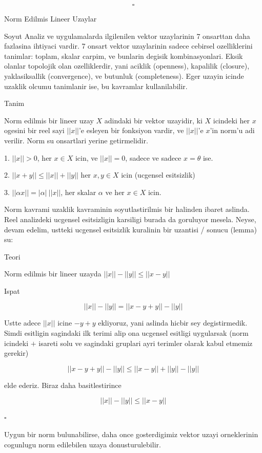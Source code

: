 \documentclass[12pt,fleqn]{article}\usepackage{../common}
\begin{document}
\[ \square \]

Norm Edilmis Lineer Uzaylar

Soyut Analiz ve uygulamalarda ilgilenilen vektor uzaylarinin 7 onsarttan
daha fazlasina ihtiyaci vardir. 7 onsart vektor uzaylarinin sadece cebirsel
ozelliklerini tanimlar: toplam, skalar carpim, ve bunlarin degisik
kombinasyonlari. Eksik olanlar topolojik olan ozelliklerdir, yani aciklik
(openness), kapalilik (closure), yaklasiksallik (convergence), ve butunluk
(completeness). Eger uzayin icinde uzaklik olcumu tanimlanir ise, bu
kavramlar kullanilabilir. 

Tanim

Norm edilmis bir lineer uzay $X$ adindaki bir vektor uzayidir, ki $X$
icindeki her $x$ ogesini bir reel sayi $||x||$'e esleyen bir fonksiyon
vardir, ve $||x||$'e $x$'in norm'u adi verilir. Norm su onsartlari yerine
getirmelidir. 

1. $||x|| > 0$, her $x \in X$ icin, ve $||x|| = 0$, sadece ve sadece $x =
\theta$ ise. 

2. $||x+y|| \le ||x|| + ||y||$ her $x,y \in X$ icin (ucgensel esitsizlik) 

3. $||\alpha x|| = |\alpha| \ ||x||$, her skalar $\alpha$ ve her $x \in X$ icin. 

Norm kavrami uzaklik kavraminin soyutlastirilmis bir halinden ibaret
aslinda. Reel analizdeki ucgensel esitsizligin karsiligi burada da
goruluyor mesela. Neyse, devam edelim, ustteki ucgensel esitsizlik
kuralinin bir uzantisi / sonucu (lemma) su:

Teori 

Norm edilmis bir lineer uzayda $||x|| - ||y|| \le ||x-y|| \ \ \ \label{1}$ 

Ispat

\[ ||x|| - ||y|| = ||x - y + y|| - ||y||\]

Ustte adece $||x||$ icine $-y+y$ ekliyoruz, yani aslinda hicbir sey
degistirmedik. Simdi esitligin sagindaki ilk terimi alip ona ucgensel
esitligi uygularsak (norm icindeki $+$ isareti solu ve sagindaki gruplari
ayri terimler olarak kabul etmemiz gerekir)

\[ ||x - y + y|| - ||y|| \le
||x - y || + ||y|| - ||y|| 
\]

elde ederiz. Biraz daha basitlestirince

\[ ||x|| - ||y||  \le ||x - y ||  \]

$\square$

Uygun bir norm bulunabilirse, daha once gosterdigimiz vektor uzayi
orneklerinin cogunlugu norm edilebilen uzaya donusturulebilir.
\end{document}
